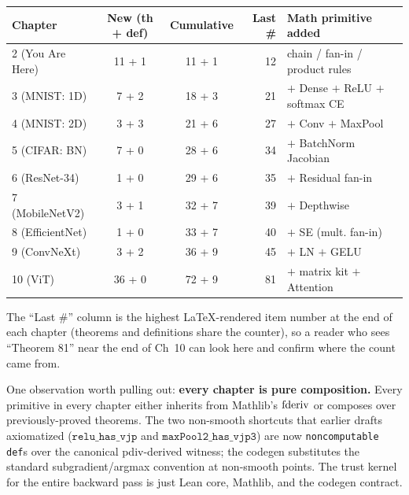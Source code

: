 \begin{center}
\begin{tabular}{l c c r l}
\hline
Chapter & New (th + def) & Cumulative & Last \# & Math primitive added \\
\hline
2 (You Are Here)       & 11 + 1  & 11 + 1 & 12 & chain / fan-in / product rules \\
3 (MNIST: 1D)          & 7 + 2   & 18 + 3 & 21 & $+$ Dense $+$ ReLU $+$ softmax CE \\
4 (MNIST: 2D)          & 3 + 3   & 21 + 6 & 27 & $+$ Conv $+$ MaxPool \\
5 (CIFAR: BN)          & 7 + 0   & 28 + 6 & 34 & $+$ BatchNorm Jacobian \\
6 (ResNet-34)          & 1 + 0   & 29 + 6 & 35 & $+$ Residual fan-in \\
7 (MobileNetV2)        & 3 + 1   & 32 + 7 & 39 & $+$ Depthwise \\
8 (EfficientNet)       & 1 + 0   & 33 + 7 & 40 & $+$ SE (mult. fan-in) \\
9 (ConvNeXt)           & 3 + 2   & 36 + 9 & 45 & $+$ LN $+$ GELU \\
10 (ViT)               & 36 + 0  & 72 + 9 & 81 & $+$ matrix kit $+$ Attention \\
\hline
\end{tabular}
\end{center}

The ``Last \#'' column is the highest LaTeX-rendered item number at
the end of each chapter (theorems and definitions share the
counter), so a reader who sees ``Theorem 81'' near the end of Ch~10
can look here and confirm where the count came from.

One observation worth pulling out: \textbf{every chapter is pure
composition.} Every primitive in every chapter either inherits
from Mathlib's \(\operatorname{fderiv}\) or composes over previously-proved
theorems. The two non-smooth shortcuts that earlier drafts axiomatized
(\(\texttt{relu\_has\_vjp}\) and \(\texttt{maxPool2\_has\_vjp3}\))
are now \texttt{noncomputable def}s over the canonical
pdiv-derived witness; the codegen substitutes the standard
subgradient/argmax convention at non-smooth points. The trust
kernel for the entire backward pass is just Lean core, Mathlib,
and the codegen contract.

